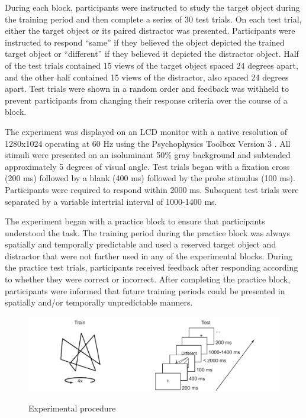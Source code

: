 \documentclass[dwyatte_dissertation.tex]{subfiles}
\begin{document}
During each block, participants were instructed to study the target object during the training period and then complete a series of 30 test trials. On each test trial, either the target object or its paired distractor was presented. Participants were instructed to respond ``same'' if they believed the object depicted the trained target object or ``different'' if they believed it depicted the distractor object. Half of the test trials contained 15 views of the target object spaced 24 degrees apart, and the other half contained 15 views of the distractor, also spaced 24 degrees apart. Test trials were shown in a random order and feedback was withheld to prevent participants from changing their response criteria over the course of a block. 

The experiment was displayed on an LCD monitor with a native resolution of 1280x1024 operating at 60 Hz using the Psychophysics Toolbox Version 3 \cite{Brainard97,Pelli97}. All stimuli were presented on an isoluminant 50\% gray background and subtended approximately 5 degrees of visual angle. Test trials began with a fixation cross (200 ms) followed by a blank (400 ms) followed by the probe stimulus (100 ms). Participants were required to respond within 2000 ms. Subsquent test trials were separated by a variable intertrial interval of 1000-1400 ms.

The experiment began with a practice block to ensure that participants understood the task. The training period during the practice block was always spatially and temporally predictable and used a reserved target object and distractor that were not further used in any of the experimental blocks. During the practice test trials, participants received feedback after responding according to whether they were correct or incorrect. After completing the practice block, participants were informed that future training periods could be presented in spatially and/or temporally unpredictable manners.

\begin{figure}[h!]
\includegraphics[width=160mm]{figs/bpleast/paperclip_task.pdf} \\
\caption{Experimental procedure}{}
\label{fig:task}
\end{figure}
\end{document}
